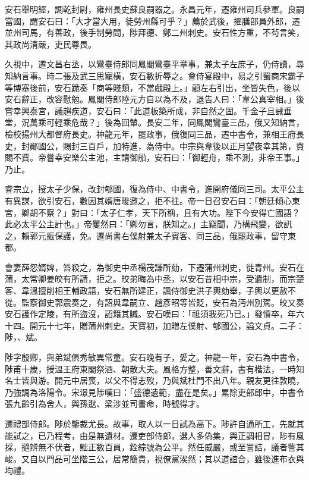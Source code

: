 \begin{pinyinscope}
 安石舉明經，調乾封尉，雍州長史蘇良嗣器之。永昌元年，遷雍州司兵參軍。良嗣當國，謂安石曰：「大才當大用，徒勞州縣可乎？」薦於武後，擢膳部員外郎，遷並州司馬，有善政，後手制勞問，陟拜德、鄭二州刺史。安石性方重，不茍言笑，其政尚清嚴，吏民尊畏。



 久視中，遷文昌右丞，以鸞臺侍郎同鳳閣鸞臺平章事，兼太子左庶子，仍侍讀，尋知納言事。時二張及武三思寵橫，安石數折辱之。會侍宴殿中，易之引蜀商宋霸子等博塞後前，安石跪奏「商等賤類，不當戲殿上。」顧左右引出，坐皆失色，後以安石辭正，改容慰勉。鳳閣侍郎陸元方自以為不及，退告人曰：「韋公真宰相。」後嘗幸興泰宮，議趨疾道，安石曰：「此道板築所成，非自然之固。千金子且誡垂堂，況萬乘可輕乘危哉？」後為回輦。長安二年，同鳳閣鸞臺三品，俄又知納言，檢校揚州大都督府長史。神龍元年，罷政事，俄復同三品，遷中書令，兼相王府長史，封鄖國公，賜封三百戶，加特進，為侍中。中宗與韋後以正月望夜幸其第，賚賜不貲。帝嘗幸安樂公主池，主請御船，安石曰：「御輕舟，乘不測，非帝王事。」乃止。



 睿宗立，授太子少保，改封郇國，復為侍中、中書令，進開府儀同三司。太平公主有異謀，欲引安石，數因其婿唐晙邀之，拒不往。帝一日召安石曰：「朝廷傾心東宮，卿胡不察？」對曰：「太子仁孝，天下所稱，且有大功。陛下今安得亡國語？此必太平公主計也。」帝矍然曰：「卿勿言，朕知之。」主竊聞，乃構飛變，欲訊之，賴郭元振保護，免。遷尚書右僕射兼太子賓客、同三品，俄罷政事，留守東都。



 會妻薛怨婿婢，笞殺之，為御史中丞楊茂謙所劾，下遷蒲州刺史，徙青州。安石在蒲，太常卿姜皎有所請，拒之。皎弟晦為中丞，以安石昔相中宗，受遺制，而宗楚客、韋溫擅削相王輔政語，安石無所建正，諷侍御史洪子輿劾舉，子輿以更赦不從。監察御史郭震奏之，有詔與韋嗣立、趙彥昭等皆貶，安石為沔州別駕。皎又奏安石護作定陵，有所盜沒，詔籍其贓。安石嘆曰：「祗須我死乃已。」發憤卒，年六十四。開元十七年，贈蒲州刺史。天寶初，加贈左僕射、郇國公，謚文貞。二子：陟，、斌。



 陟字殷卿，與弟斌俱秀敏異常童。安石晚有子，愛之。神龍一年，安石為中書令，陟甫十歲，授溫王府東閣祭酒、朝散大夫。風格方整，善文辭，書有楷法，一時知名士皆與游。開元中居喪，以父不得志歿，乃與斌杜門不出八年。親友更往敦曉，乃強調為洛陽令。宋璟見陟嘆曰：「盛德遺範，盡在是矣。」累除吏部郎中，中書令張九齡引為舍人，與孫逖、梁涉並司書命，時號得才。



 遷禮部侍郎。陟於鑒裁尤長。故事，取人以一日試為高下。陟許自通所工，先就其能試之，已乃程考，由是無遺材。遷吏部侍郎，選人多偽集，與正調相冒，陟有風採，擿辨無不伏者，黜正數百員，銓綜號為公平。然任威嚴，或至詈詰，議者訾其峻。又自以門品可坐階三公，居常簡貴，視僚黨涘然；其以道誼合，雖後進布衣與均禮。




\end{pinyinscope}
